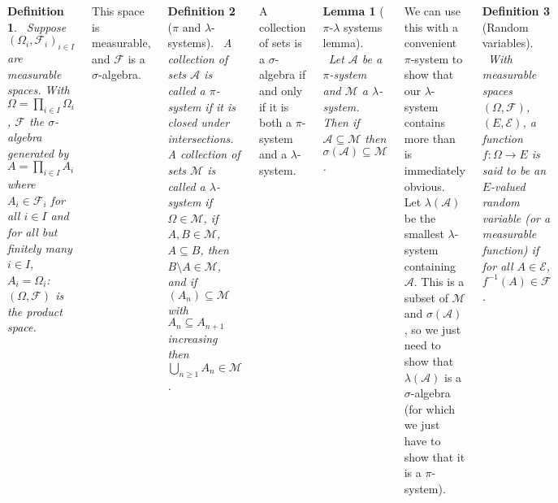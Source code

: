 \documentclass{tikzposter} %
\newtheorem{lemma}[theorem]{Lemma}
\newtheorem{definition}{Definition}
\begin{document}
\begin{columns}
{    \begin{definition}
    \ Suppose $(\Omega_{i}, \mathcal{F}_{i})_{i \in I}$ are measurable spaces. With $\Omega = \prod_{i \in I} \Omega_{i}$, $\mathcal{F}$ the $\sigma$-algebra generated by $A = \prod_{i \in I} A_{i}$ where $A_{i} \in \mathcal{F}_{i}$ for all $i \in I$ and for all but finitely many $i \in I$, $A_{i} = \Omega_{i}$: $(\Omega, \mathcal{F})$ is the product space.
    \end{definition}
    \hphantom{}

    This space is measurable, and $\mathcal{F}$ is a $\sigma$-algebra. \\

    \begin{definition}[$\pi$ and $\lambda$-systems]
    \ A collection of sets $\mathcal{A}$ is called a $\pi$-system if it is closed under intersections. \\

      A collection of sets $\mathcal{M}$ is called a $\lambda$-system if $\Omega \in \mathcal{M}$, if $A, B \in \mathcal{M}$, $A \subseteq B$, then $B \setminus A \in \mathcal{M}$, and if $(A_{n}) \subseteq \mathcal{M}$ with $A_{n} \subseteq A_{n+1}$ increasing then $\bigcup_{n \ge 1} A_{n} \in \mathcal{M}$.
    \end{definition}
    \hphantom{}

    A collection of sets is a $\sigma$-algebra if and only if it is both a $\pi$-system and a $\lambda$-system. \\

    \begin{lemma}[$\pi$-$\lambda$ systems lemma]
    \ Let $\mathcal{A}$ be a $\pi$-system and $\mathcal{M}$ a $\lambda$-system. Then if $\mathcal{A} \subseteq \mathcal{M}$ then $\sigma(\mathcal{A}) \subseteq \mathcal{M}$.
    \end{lemma}
    \hphantom{}

    We can use this with a convenient $\pi$-system to show that our $\lambda$-system contains more than is immediately obvious. \\

    Let $\lambda(\mathcal{A})$ be the smallest $\lambda$-system containing $\mathcal{A}$. This is a subset of $\mathcal{M}$ and $\sigma(\mathcal{A})$, so we just need to show that $\lambda(\mathcal{A})$ is a $\sigma$-algebra (for which we just have to show that it is a $\pi$-system). \\

    \begin{definition}[Random variables]
    \ With measurable spaces $(\Omega, \mathcal{F})$, $(E, \mathcal{E})$, a function $f : \Omega \to E$ is said to be an $E$-valued random variable (or a measurable function) if for all $A \in \mathcal{E}$, $f^{-1}(A) \in \mathcal{F}$.
    \end{definition}
    \hphantom{}

}
\end{columns}
\end{document}
